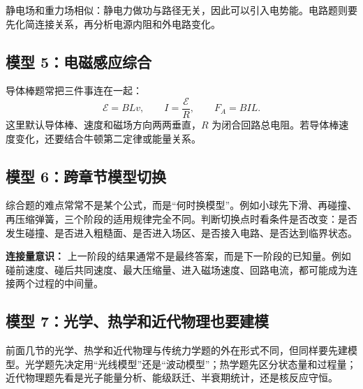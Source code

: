 静电场和重力场相似：静电力做功与路径无关，因此可以引入电势能。电路题则要先化简连接关系，再分析电源内阻和外电路变化。

\subsection*{模型 5：电磁感应综合}

导体棒题常把三件事连在一起：
\[
\mathcal E=BLv,\qquad I=\frac{\mathcal E}{R},\qquad F_A=BIL.
\]
这里默认导体棒、速度和磁场方向两两垂直，$R$ 为闭合回路总电阻。若导体棒速度变化，还要结合牛顿第二定律或能量关系。

\begin{center}


\label{fig:multi-model-problem}
\end{center}

\subsection*{模型 6：跨章节模型切换}

综合题的难点常常不是某个公式，而是“何时换模型”。例如小球先下滑、再碰撞、再压缩弹簧，三个阶段的适用规律完全不同。判断切换点时看条件是否改变：是否发生碰撞、是否进入粗糙面、是否进入场区、是否接入电路、是否达到临界状态。

\begin{center}


\label{fig:model-switching-map}
\end{center}

\textbf{连接量意识：} 上一阶段的结果通常不是最终答案，而是下一阶段的已知量。例如碰前速度、碰后共同速度、最大压缩量、进入磁场速度、回路电流，都可能成为连接两个过程的中间量。

\subsection*{模型 7：光学、热学和近代物理也要建模}

前面几节的光学、热学和近代物理与传统力学题的外在形式不同，但同样要先建模型。光学题先决定用“光线模型”还是“波动模型”；热学题先区分状态量和过程量；近代物理题先看是光子能量分析、能级跃迁、半衰期统计，还是核反应守恒。

\begin{center}


\label{fig:model-review-late-topics}
\end{center}

